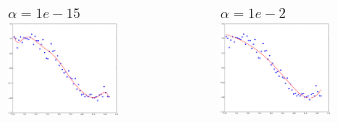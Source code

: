 \documentclass[handout]{beamer}
\begin{document}
\begin{frame}
\begin{columns}
\begin{figure}
\end{figure}
\vspace{-2em}
\begin{figure}
$\alpha=1e-15$
\includegraphics[width=0.99\textwidth]{./fig/L1/ridge_alpha1e-15.png}
\end{figure}
\vspace{-2em}
\begin{figure}
$\alpha=1e-2$
\includegraphics[width=0.99\textwidth]{./fig/L1/ridge_alpha1e-2.png}
\end{figure}

\end{columns}
\end{frame}
\end{document}
